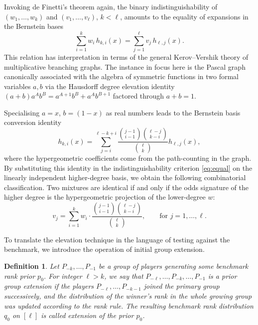 \documentclass[10pt,a4paper]{amsart}
\newtheorem{definition}[theorem]{Definition}
\numberwithin{equation}{section}
\begin{document}
Invoking de Finetti's theorem again, the binary indistinguishability of \((w_1,\dots,w_k)\) and \((v_1,\dots,v_\ell)\), \(k<\ell\), amounts to the equality of expansions in the Bernstein bases
\begin{equation}\label{eq:equal}
\sum_{i=1}^k w_i\,h_{k,i}(x)=\sum_{j=1}^\ell v_j\,h_{\ell,j}(x).
\end{equation}
This relation has interpretation in terms of the general Kerov--Vershik theory of multiplicative branching graphs. The instance \cite{VershikKerov1987} in focus here is the Pascal graph canonically associated with the algebra of symmetric functions in two formal variables \(a,b\) via the Hausdorff degree elevation identity \((a+b)a^Ab^B=a^{A+1}b^B+a^Ab^{B+1}\) factored through \(a+b=1\).

Specialising \(a=x\), \(b=(1-x)\) as real numbers leads to the Bernstein basis conversion identity
\begin{equation}\label{eq:Bernstein}
h_{k,i}(x)=\sum_{j=i}^{\ell-k+i}\frac{\binom{j-1}{i-1}\binom{\ell-j}{k-i}}{\binom{\ell}{k}}h_{\ell,j}(x),
\end{equation}
where the hypergeometric coefficients come from the path-counting in the graph. By substituting this identity in the indistinguishability criterion \eqref{eq:equal} on the linearly independent higher-degree basis, we obtain the following combinatorial classification. Two mixtures are identical if and only if the odds signature of the higher degree is the hypergeometric projection of the lower-degree \(w\):
\begin{equation}\label{eq:vj}
v_j=\sum_{i=1}^k w_i\cdot\frac{\binom{j-1}{i-1}\binom{\ell-j}{k-i}}{\binom{\ell}{k}},\qquad\text{for }j=1,\dots,\ell.
\end{equation}

To translate the elevation technique in the language of testing against the benchmark, we introduce the operation of initial group extension.

\begin{definition}
Let \(P_{-k},\dots,P_{-1}\) be a group of players generating some benchmark rank prior \(p_0\). For integer \(\ell>k\), we say that \(P_{-\ell},\dots,P_{-k},\dots,P_{-1}\) is a prior group extension if the players \(P_{-\ell},\dots,P_{-k-1}\) joined the primary group successively, and the distribution of the winner's rank in the whole growing group was updated according to the rank rule. The resulting benchmark rank distribution \(q_0\) on \([\ell]\) is called extension of the prior \(p_0\).
\end{definition}
\end{document}
